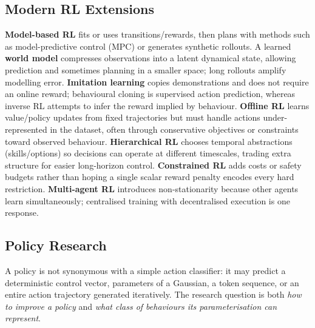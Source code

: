 \subsection{Modern RL Extensions}\label{sec:rl-extensions}
\textbf{Model-based RL} fits or uses transitions/rewards, then plans with methods such as model-predictive control (MPC) or generates synthetic rollouts.
A learned \textbf{world model} compresses observations into a latent dynamical state, allowing prediction and sometimes planning in a smaller space; long rollouts amplify modelling error.
\textbf{Imitation learning} copies demonstrations and does not require an online reward; behavioural cloning is supervised action prediction, whereas inverse RL attempts to infer the reward implied by behaviour.
\textbf{Offline RL} learns value/policy updates from fixed trajectories but must handle actions under-represented in the dataset, often through conservative objectives or constraints toward observed behaviour.
\textbf{Hierarchical RL} chooses temporal abstractions (skills/options) so decisions can operate at different timescales, trading extra structure for easier long-horizon control.
\textbf{Constrained RL} adds costs or safety budgets rather than hoping a single scalar reward penalty encodes every hard restriction.
\textbf{Multi-agent RL} introduces non-stationarity because other agents learn simultaneously; centralised training with decentralised execution is one response.

\subsection{Policy Research}\label{sec:rl-policy-research}
A policy is not synonymous with a simple action classifier: it may predict a deterministic control vector, parameters of a Gaussian, a token sequence, or an entire action trajectory generated iteratively.
The research question is both \emph{how to improve a policy} and \emph{what class of behaviours its parameterisation can represent}.


